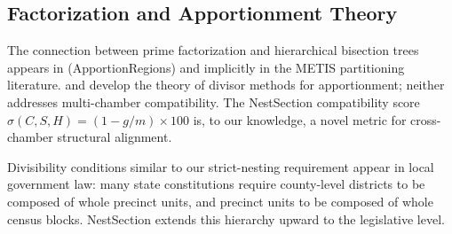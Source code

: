 \subsection{Factorization and Apportionment Theory}

The connection between prime factorization and hierarchical bisection trees
appears in \citet{B11} (ApportionRegions) and implicitly in the METIS
partitioning literature.  \citet{huntington1921} and \citet{balinski1982}
develop the theory of divisor methods for apportionment; neither addresses
multi-chamber compatibility.  The NestSection compatibility score
$\sigma(C, S, H) = (1 - g/m) \times 100$ is, to our knowledge, a novel
metric for cross-chamber structural alignment.

Divisibility conditions similar to our strict-nesting requirement appear in
local government law: many state constitutions require county-level districts
to be composed of whole precinct units, and precinct units to be composed of
whole census blocks.  NestSection extends this hierarchy upward to the
legislative level.
